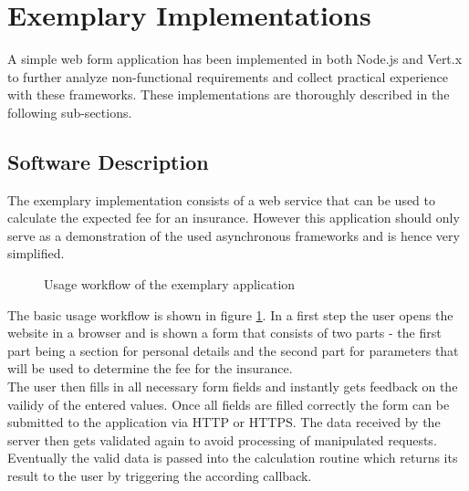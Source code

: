     


\newpage
\section{Exemplary Implementations}
\label{exemplary_implementations}

A simple web form application has been implemented in both Node.js and Vert.x to
further analyze non-functional requirements and collect practical experience
with these frameworks. These implementations are thoroughly described in the following sub-sections.

\subsection{Software Description}
\label{software_description}
\FloatBarrier
The exemplary implementation consists of a web service that can be used to calculate
the expected fee for an insurance. However this application should only serve as a 
demonstration of the used asynchronous frameworks and is hence very simplified.

\begin{figure}[h]
	\centering
	\setlength\fboxsep{2pt}
	\caption{Usage workflow of the exemplary application}
	\label{fig:application_workflow}
\end{figure}


The basic usage workflow is shown in figure \ref{fig:application_workflow}. In a
first step the user opens the website in a browser and is shown a form that
consists of two parts - the first part being a section for personal details and
the second part for parameters that will be used to determine the fee for the
insurance.\\
The user then fills in all necessary form fields and instantly gets feedback on
the vailidy of the entered values. Once all fields are filled correctly the form
can be submitted to the application via HTTP or HTTPS. The data received by the server
then gets validated again to avoid processing of manipulated requests. Eventually
the valid data is passed into the calculation routine which returns its result
to the user by triggering the according callback.

